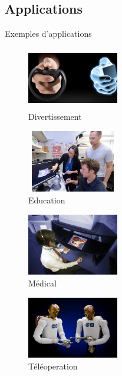 \subsection{Applications}
\begin{frame}{Exemples d'applications}
\begin{multicols}{2}
\begin{figure}
	\centering			
	\includegraphics[width=4cm,height=2.7cm]{images/touch_vr}%
	\caption{Divertissement}
	\end{figure}
		\vspace{-0.7cm}	
	\begin{figure}	
	\includegraphics[width=4cm, height=2.7cm]{images/education}%
	\caption{Education}
	\end{figure}

\begin{figure}
	\centering			
	\includegraphics[width=4cm,height=2.7cm]{images/hapticSurgery}%
	\caption{Médical}
		\end{figure}	
					\vspace{-1.5cm}	
	\begin{figure}
	\includegraphics[width=4cm,height=2.7cm]{images/teleoperation}%
	\caption{Téléoperation}
	\end{figure}
	
\end{multicols}
\end{frame}

